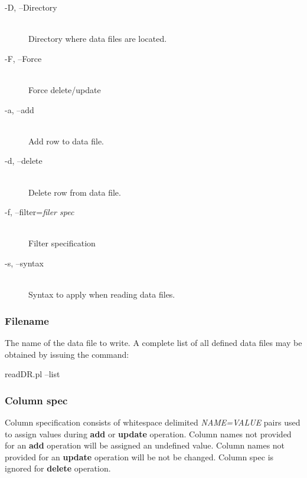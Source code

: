 \begin{description}

\item[-D, --Directory]%
%
\hfil\\
Directory where data files are located.

\item[-F, --Force]%
%
\hfil\\
Force delete/update

\item[-a, --add]%
%
\hfil\\
Add row to data file.

\item[-d, --delete]%
%
\hfil\\
Delete row from data file.

\item[-f, --filter={\em filer spec\/}]%
%
\hfil\\
Filter specification

\item[-s, --syntax]%
%
\hfil\\
Syntax to apply when reading data files.

\end{description}

\subsubsection*{Filename}%

The name of the data file to write. A complete list of all defined data files may
be obtained by issuing the command:

readDR.pl --list

\subsubsection*{Column spec}%

Column specification consists of whitespace delimited {\em NAME=VALUE\/} pairs
used to assign values during {\bf add} or {\bf update} operation. Column names
not provided for an {\bf add} operation will be assigned an undefined value.
Column names not provided for an {\bf update} operation will be not be changed.
Column spec is ignored for {\bf delete} operation.


